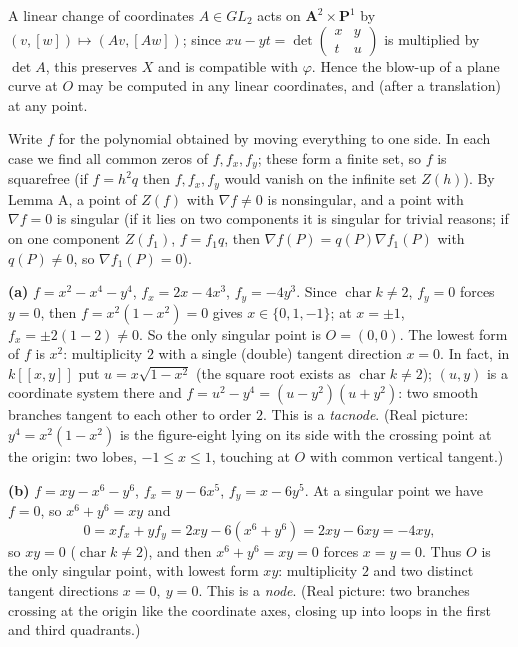 \documentclass[11pt]{article}
\begin{document}
A linear change of coordinates $A\in GL_2$ acts on $\mathbf A^2\times\mathbf P^1$ by $(v,[w])\mapsto(Av,[Aw])$; since $xu-yt=\det\begin{pmatrix}x&y\\t&u\end{pmatrix}$ is multiplied by $\det A$, this preserves $X$ and is compatible with $\varphi$. Hence the blow-up of a plane curve at $O$ may be computed in any linear coordinates, and (after a translation) at any point.

\pf
Write $f$ for the polynomial obtained by moving everything to one side. In each case we find all common zeros of $f,f_x,f_y$; these form a finite set, so $f$ is squarefree (if $f=h^2q$ then $f,f_x,f_y$ would vanish on the infinite set $Z(h)$). By Lemma A, a point of $Z(f)$ with $\nabla f\neq0$ is nonsingular, and a point with $\nabla f=0$ is singular (if it lies on two components it is singular for trivial reasons; if on one component $Z(f_1)$, $f=f_1q$, then $\nabla f(P)=q(P)\nabla f_1(P)$ with $q(P)\ne0$, so $\nabla f_1(P)=0$).

\textbf{(a)} $f=x^2-x^4-y^4$, $f_x=2x-4x^3$, $f_y=-4y^3$. Since $\operatorname{char}k\ne2$, $f_y=0$ forces $y=0$, then $f=x^2(1-x^2)=0$ gives $x\in\{0,1,-1\}$; at $x=\pm1$, $f_x=\pm2(1-2)\neq0$. So the only singular point is $O=(0,0)$. The lowest form of $f$ is $x^2$: multiplicity $2$ with a single (double) tangent direction $x=0$. In fact, in $k[[x,y]]$ put $u=x\sqrt{1-x^2}$ (the square root exists as $\operatorname{char}k\neq2$); $(u,y)$ is a coordinate system there and $f=u^2-y^4=(u-y^2)(u+y^2)$: two smooth branches tangent to each other to order $2$. This is a \emph{tacnode}. (Real picture: $y^4=x^2(1-x^2)$ is the figure-eight lying on its side with the crossing point at the origin: two lobes, $-1\le x\le 1$, touching at $O$ with common vertical tangent.)

\textbf{(b)} $f=xy-x^6-y^6$, $f_x=y-6x^5$, $f_y=x-6y^5$. At a singular point we have $f=0$, so $x^6+y^6=xy$ and
\[
0=xf_x+yf_y=2xy-6(x^6+y^6)=2xy-6xy=-4xy,
\]
so $xy=0$ ($\operatorname{char}k\ne2$), and then $x^6+y^6=xy=0$ forces $x=y=0$. Thus $O$ is the only singular point, with lowest form $xy$: multiplicity $2$ and two distinct tangent directions $x=0,\ y=0$. This is a \emph{node}. (Real picture: two branches crossing at the origin like the coordinate axes, closing up into loops in the first and third quadrants.)
\end{document}
